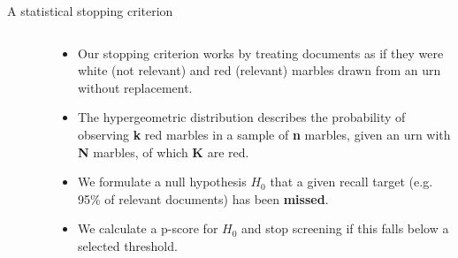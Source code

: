 \documentclass[9pt,aspectratio=169]{beamer}
\begin{document}
\begin{frame}{A statistical stopping criterion}
\begin{columns}
\begin{column}{0.382\linewidth}
\begin{figure}
		\end{figure}
	\end{column}
	\begin{column}{0.618\linewidth}
		\begin{itemize}
			\item<1-> Our stopping criterion works by treating documents as if they were white (not relevant) and red (relevant) marbles drawn from an urn without replacement.
			\item<2-> The hypergeometric distribution describes the probability of observing \textbf{k} red marbles in a sample of \textbf{n} marbles, given an urn with \textbf{N} marbles, of which \textbf{K} are red.
			\item<3-> We formulate a null hypothesis $H_0$ that a given recall target (e.g. 95\% of relevant documents) has been \textbf{missed}. 
			\item<4-> We calculate a p-score for $H_0$ and stop screening if this falls below a selected threshold.
		\end{itemize}
	\end{column}

\end{columns}

\medskip

\bigskip


\end{frame}
\end{document}
